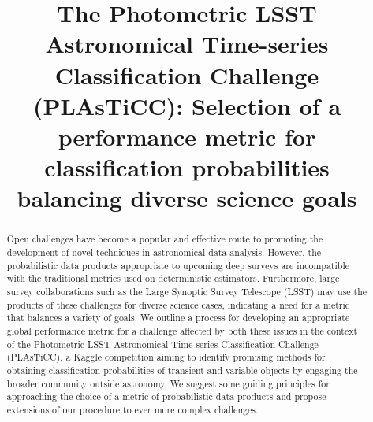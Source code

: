 \documentclass[\docopts]{\docclass}
\begin{document}
\title{The Photometric LSST Astronomical Time-series Classification Challenge (PLAsTiCC): Selection of a performance metric for classification probabilities balancing diverse science goals}

\maketitlepre

\begin{abstract}

  Open challenges have become a popular and effective route to promoting the development of novel techniques in astronomical data analysis.
  However, the probabilistic data products appropriate to upcoming deep surveys are incompatible with the traditional metrics used on deterministic estimators.
  Furthermore, large survey collaborations such as the Large Synoptic Survey Telescope (LSST) may use the products of these challenges for diverse science cases, indicating a need for a metric that balances a variety of goals.
  We outline a process for developing an appropriate global performance metric for a challenge affected by both these issues in the context of the Photometric LSST Astronomical Time-series Classification Challenge (PLAsTiCC), a Kaggle competition aiming to identify promising methods for obtaining classification probabilities of transient and variable objects by engaging the broader community outside astronomy.
  We suggest some guiding principles for approaching the choice of a metric of probabilistic data products and propose extensions of our procedure to ever more complex challenges.

\end{abstract}

\dockeys{}

\maketitlepost














\end{document}
